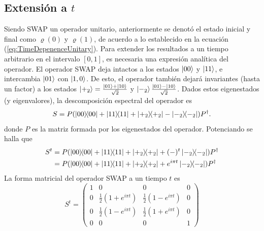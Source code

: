 \subsection{Extensión a $t$}
Siendo \textsc{SWAP} un operador unitario, anteriormente se denotó el estado inicial y final como $\varrho(0)$ y $\varrho(1)$, de acuerdo a lo establecido en la ecuación (\ref{eq:TimeDepenenceUnitary}). Para extender los resultados a un tiempo arbitrario en el intervalo $[0,1]$, es necesaria una expresión analítica del operador. El operador SWAP deja intactos a los estados $\ket{00}$ y $\ket{11}$, e intercambia $\ket{01}$ con $\ket{1,0}$. De esto, el operador también dejará invariantes (hasta un factor) a los estados $\ket{+_{2}}=\frac{\ket{01}+\ket{10}}{\sqrt{2}}$ y $\ket{-_{2}}\frac{\ket{01}-\ket{10}}{\sqrt{2}}$. Dados estos eigenestados (y eigenvalores), la descomposición espectral del operador es
\begin{equation}\label{eq:SWAPSpectral}
S=P(\dyad{00}+\dyad{11}+\dyad{+_{2}}-\dyad{-_{2}})P^{\dag}.
\end{equation}
donde $P$ es la matriz formada por los eigenestados del operador. Potenciando se halla que
\begin{align}\label{eq:SWAPPower}
S^{t}&=P(\dyad{00}+\dyad{11}+\dyad{+_{2}}+(-)^{t}\dyad{-_{2}})P^{\dag}\\
&=P(\dyad{00}+\dyad{11}+\dyad{+_{2}}+e^{i \pi t}\dyad{-_{2}})P^{\dag}
\end{align}
La forma matricial del operador \textsc{SWAP} a un tiempo $t$ es
\begin{equation}
S^{t}=\begin{pmatrix}
 1 & 0 & 0 & 0 \\
 0 & \frac{1}{2}(1+e^{i \pi t}) & \frac{1}{2} (1-e^{i \pi t}) & 0 \\
 0 & \frac{1}{2}(1-e^{i \pi t}) & \frac{1}{2}(1+e^{i \pi t}) & 0 \\
 0 & 0 & 0 & 1
\end{pmatrix}
\end{equation}
